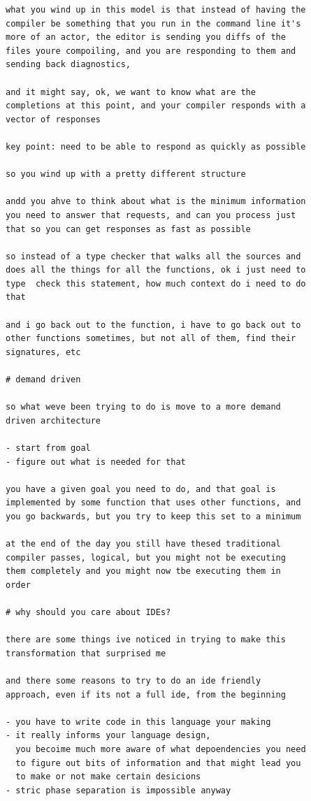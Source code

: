 \documentclass[12pt, a4paper]{report}
\begin{document}
\begin{Verbatim}[fontsize=\small]
what you wind up in this model is that instead of having the
compiler be something that you run in the command line it's
more of an actor, the editor is sending you diffs of the
files youre compoiling, and you are responding to them and
sending back diagnostics,

and it might say, ok, we want to know what are the
completions at this point, and your compiler responds with a
vector of responses

key point: need to be able to respond as quickly as possible

so you wind up with a pretty different structure

andd you ahve to think about what is the minimum information
you need to answer that requests, and can you process just
that so you can get responses as fast as possible

so instead of a type checker that walks all the sources and
does all the things for all the functions, ok i just need to
type  check this statement, how much context do i need to do
that

and i go back out to the function, i have to go back out to
other functions sometimes, but not all of them, find their
signatures, etc

# demand driven

so what weve been trying to do is move to a more demand
driven architecture

- start from goal
- figure out what is needed for that

you have a given goal you need to do, and that goal is
implemented by some function that uses other functions, and
you go backwards, but you try to keep this set to a minimum

at the end of the day you still have thesed traditional
compiler passes, logical, but you might not be executing
them completely and you might now tbe executing them in
order

# why should you care about IDEs?

there are some things ive noticed in trying to make this
transformation that surprised me

and there some reasons to try to do an ide friendly
approach, even if its not a full ide, from the beginning

- you have to write code in this language your making
- it really informs your language design,
  you becoime much more aware of what depoendencies you need
  to figure out bits of information and that might lead you
  to make or not make certain desicions
- stric phase separation is impossible anyway


\end{Verbatim}
\end{document}
